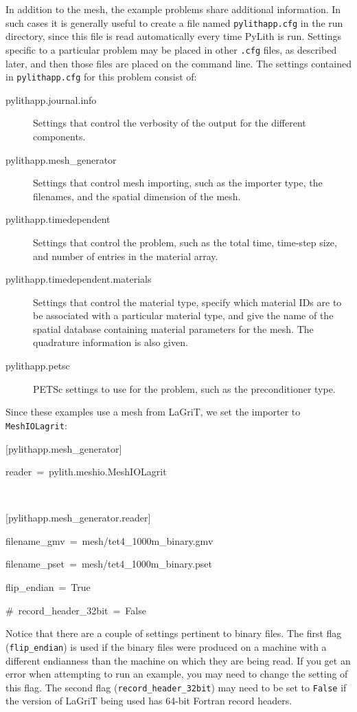 In addition to the mesh, the example problems share additional information.
In such cases it is generally useful to create a file named \texttt{pylithapp.cfg}
in the run directory, since this file is read automatically every
time PyLith is run. Settings specific to a particular problem may
be placed in other \texttt{.cfg} files, as described later, and then
those files are placed on the command line.  The settings contained
in \texttt{pylithapp.cfg} for this problem consist of:
\begin{description}
\item [{pylithapp.journal.info}] Settings that control the verbosity of
the output for the different components.
\item [{pylithapp.mesh\_generator}] Settings that control mesh importing,
such as the importer type, the filenames, and the spatial dimension
of the mesh.
\item [{pylithapp.timedependent}] Settings that control the problem, such
as the total time, time-step size, and number of entries in the material
array.
\item [{pylithapp.timedependent.materials}] Settings that control the material
type, specify which material IDs are to be associated with a particular
material type, and give the name of the spatial database containing
material parameters for the mesh. The quadrature information is also
given.
\item [{pylithapp.petsc}] PETSc settings to use for the problem, such as
the preconditioner type.
\end{description}
Since these examples use a mesh from LaGriT, we set the importer to
\texttt{MeshIOLagrit}:
\begin{lyxcode}
{[}pylithapp.mesh\_generator{]}

reader~=~pylith.meshio.MeshIOLagrit

~

{[}pylithapp.mesh\_generator.reader{]}

filename\_gmv~=~mesh/tet4\_1000m\_binary.gmv

filename\_pset~=~mesh/tet4\_1000m\_binary.pset

flip\_endian~=~True

\#~record\_header\_32bit~=~False
\end{lyxcode}
Notice that there are a couple of settings pertinent to binary files.
The first flag (\texttt{flip\_endian}) is used if the binary files
were produced on a machine with a different endianness than the machine
on which they are being read. If you get an error when attempting
to run an example, you may need to change the setting of this flag.
The second flag (\texttt{record\_header\_32bit}) may need to be set
to \texttt{False} if the version of LaGriT being used has 64-bit Fortran
record headers. 

